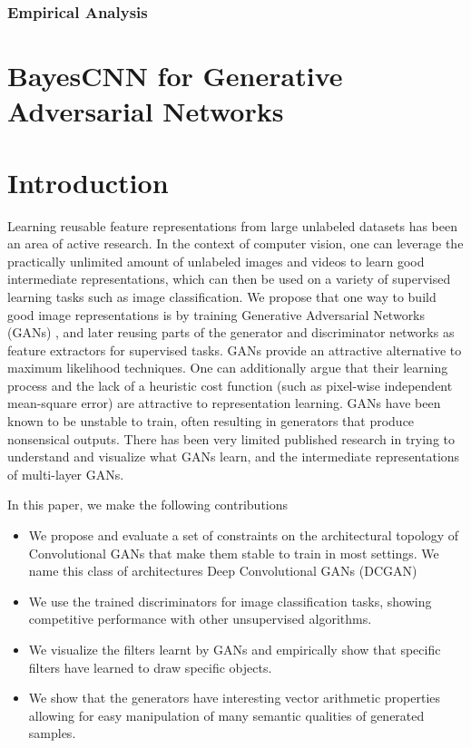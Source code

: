 \subsubsection{Empirical Analysis}



\section{BayesCNN for Generative Adversarial Networks}

\section{Introduction}

Learning reusable feature representations from large unlabeled datasets has been an area of active research. In the context of computer vision, one can leverage the practically unlimited amount of unlabeled images and videos to learn good intermediate representations, which can then be used on a variety of supervised learning tasks such as image classification. We propose that one way to build good image representations is by training Generative Adversarial Networks (GANs) \citep{Goodfellow2014}, and later reusing parts of the generator and discriminator networks as feature extractors for supervised tasks. GANs provide an attractive alternative to maximum likelihood techniques. One can additionally argue that their learning process and the lack of a heuristic cost function (such as pixel-wise independent mean-square error) are attractive to representation learning. GANs have been known to be unstable to train, often resulting in generators that produce nonsensical outputs. There has been very limited published research in trying to understand and visualize what GANs learn, and the intermediate representations of multi-layer GANs.

In this paper, we make the following contributions
\begin{itemize}  
    \item We propose and evaluate a set of constraints on the architectural topology of Convolutional GANs that make them stable to train in most settings. We name this class of architectures Deep Convolutional GANs (DCGAN)
    \item We use the trained discriminators for image classification tasks, showing competitive performance with other unsupervised algorithms.
    \item We visualize the filters learnt by GANs and empirically show that specific filters have learned to draw specific objects.
    \item We show that the generators have interesting vector arithmetic properties allowing for easy manipulation of many semantic qualities of generated samples.
\end{itemize}

